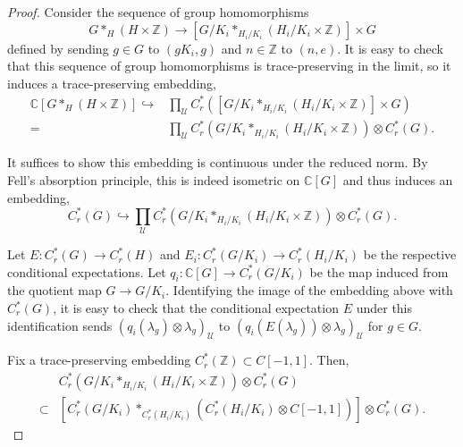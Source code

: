 \documentclass[10pt,a4paper]{amsart}
\newcommand{\C}{\ensuremath{\mathbb{C}}}
\newcommand{\Z}{\ensuremath{\mathbb{Z}}}
\newcommand{\cU}{\ensuremath{\mathcal{U}}}
\begin{document}
\begin{proof}
    Consider the sequence of group homomorphisms
    \begin{equation*}
        G \ast_H (H \times \Z) \to [G/K_i \ast_{H_i/K_i} (H_i/K_i \times \Z)] \times G
    \end{equation*}
    defined by sending $g\in G$ to $(gK_i, g)$ and $n\in \Z$ to $(n,e)$. It is easy to check that this sequence of group homomorphisms is trace-preserving in the limit, so it induces a trace-preserving embedding,
    \begin{equation}\label{eqn: group alg map}
    \begin{split}
        \C[G \ast_H (H \times \Z)] \hookrightarrow &\prod_\cU C_r^\ast([G/K_i \ast_{H_i/K_i} (H_i/K_i \times \Z)] \times G)\\
        = &\prod_\cU C_r^\ast(G/K_i \ast_{H_i/K_i} (H_i/K_i \times \Z)) \otimes C_r^\ast(G).
    \end{split}
    \end{equation}

    It suffices to show this embedding is continuous under the reduced norm. By Fell's absorption principle, this is indeed isometric on $\C[G]$ and thus induces an embedding,
    \begin{equation}\label{eqn: embedding}
        C_r^\ast(G) \hookrightarrow \prod_\cU C_r^\ast(G/K_i \ast_{H_i/K_i} (H_i/K_i\times\Z)) \otimes C_r^\ast(G).
    \end{equation}

    Let $E:C_r^\ast(G) \to C_r^\ast(H)$ and $E_i: C_r^\ast(G/K_i) \to C_r^\ast(H_i/K_i)$ be the respective conditional expectations. Let $q_i: \C[G] \to C_r^\ast(G/K_i)$ be the map induced from the quotient map $G \to G/K_i$. Identifying the image of the embedding above with $C_r^\ast(G)$, it is easy to check that the conditional expectation $E$ under this identification sends $(q_i(\lambda_g) \otimes \lambda_g)_\cU$ to $(q_i(E(\lambda_g)) \otimes \lambda_g)_\cU$ for $g \in G$.

    Fix a trace-preserving embedding $C_r^\ast(\Z) \subset C[-1, 1]$. Then,
    \begin{equation}\label{eqn: group embedding}
    \begin{split}
        &C_r^\ast(G/K_i \ast_{H_i/K_i} (H_i/K_i\times\Z)) \otimes C_r^\ast(G)\\
        \subset &[C_r^\ast(G/K_i) \ast_{C_r^\ast(H_i/K_i)} (C_r^\ast(H_i/K_i) \otimes C[-1,1])] \otimes C_r^\ast(G).
    \end{split}
    \end{equation}


\end{proof}
\end{document}
